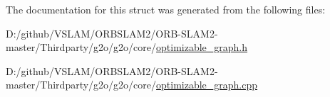 The documentation for this struct was generated from the following files\+:\begin{DoxyCompactItemize}
\item 
D\+:/github/\+V\+S\+L\+A\+M/\+O\+R\+B\+S\+L\+A\+M2/\+O\+R\+B-\/\+S\+L\+A\+M2-\/master/\+Thirdparty/g2o/g2o/core/\mbox{\hyperlink{optimizable__graph_8h}{optimizable\+\_\+graph.\+h}}\item 
D\+:/github/\+V\+S\+L\+A\+M/\+O\+R\+B\+S\+L\+A\+M2/\+O\+R\+B-\/\+S\+L\+A\+M2-\/master/\+Thirdparty/g2o/g2o/core/\mbox{\hyperlink{optimizable__graph_8cpp}{optimizable\+\_\+graph.\+cpp}}\end{DoxyCompactItemize}
